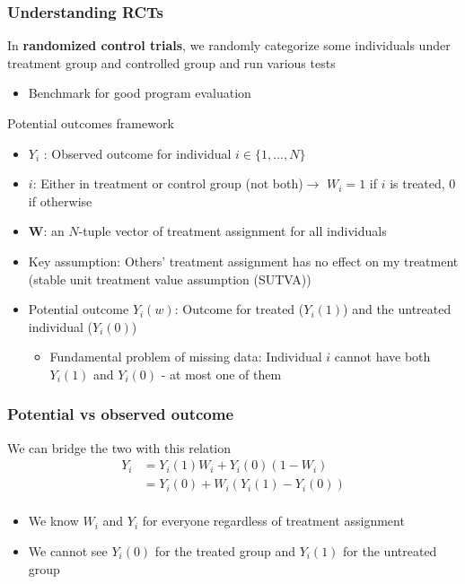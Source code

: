 \documentclass[aspectratio=169]{beamer}
\newenvironment{wideitemize}{\itemize\addtolength{\itemsep}{10pt}}{\enditemize}
\begin{document}
\begin{frame}
\frametitle{Understanding RCTs}
\begin{wideitemize}
\item In \textbf{randomized control trials}, we randomly categorize some individuals under treatment group and controlled group and run various tests
\begin{itemize}
\item Benchmark for good program evaluation
\end{itemize}
\item Potential outcomes framework
\begin{itemize}
\item $Y_i$ : Observed outcome for individual $i\in\{1,...,N\}$
\item $i$: Either in treatment or control group (not both)$\to$ $W_i=1$ if $i$ is treated, 0 if otherwise
\item $\mathbf{W}$:  an $N$-tuple vector of treatment assignment for all individuals
\item Key assumption: Others' treatment assignment has no effect on my treatment (stable unit treatment value assumption (SUTVA))
\item Potential outcome $Y_i(w)$: Outcome for treated ($Y_i(1)$) and the untreated individual ($Y_i(0)$)
\begin{itemize}
\item Fundamental problem of missing data: Individual $i$ cannot have both $Y_i(1)$ and $Y_i(0)$ - at most one of them
\end{itemize}
\end{itemize}
 \end{wideitemize}
\end{frame}

\begin{frame}
\frametitle{Potential vs observed outcome}
\begin{wideitemize}
\item We can bridge the two with this relation
\[
\begin{aligned}
Y_ i &= Y_i(1)W_i + Y_i(0)(1-W_i)\\
&=Y_i(0)+W_i(Y_i(1)-Y_i(0))\\
\end{aligned}
\]
\begin{itemize}
\item We know $W_i$ and $Y_i$ for everyone regardless of treatment assignment
\item We cannot see $Y_i(0)$ for the treated group and $Y_i(1)$ for the untreated group
\end{itemize}
 \end{wideitemize}
\end{frame}
\end{document}

